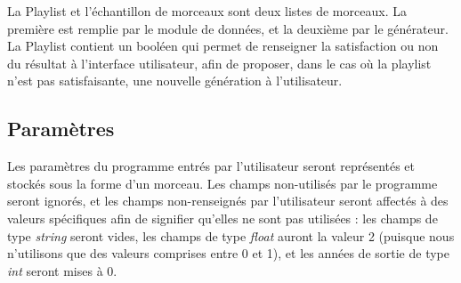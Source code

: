 La Playlist et l'échantillon de morceaux sont deux listes de morceaux. La 
première est remplie par le module de données, et la deuxième par le 
générateur. La Playlist contient un booléen qui permet de renseigner la 
satisfaction ou non du résultat à l'interface utilisateur, afin de proposer, 
dans le cas où la playlist n'est pas satisfaisante, une nouvelle génération 
à l'utilisateur.

\subsection{Paramètres}
\label{archi:structures:param}

Les paramètres du programme entrés par l'utilisateur seront représentés et 
stockés sous la forme d'un morceau. Les champs non-utilisés par le programme 
seront ignorés, et les champs non-renseignés par l'utilisateur seront 
affectés à des valeurs spécifiques afin de signifier qu'elles ne sont pas 
utilisées : les champs de type \textit{string} seront vides, les champs de 
type \textit{float} auront la valeur 2 (puisque nous n'utilisons que des 
valeurs comprises entre 0 et 1), et les années de sortie de type 
\textit{int} seront mises à 0.